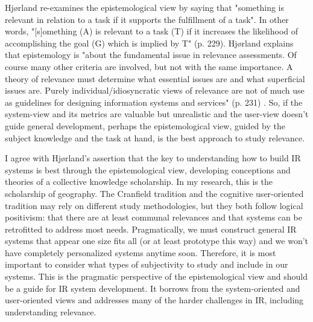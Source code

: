 
Hjørland re-examines the epistemological view by saying that "something is relevant in relation to a task if it supports the fulfillment of a task". In other words, "[s]omething (A) is relevant to a task (T) if it increases the likelihood of accomplishing the goal (G) which is implied by T" \cite{Hjorland2010}(p. 229). Hjørland explains that epistemology is "about the fundamental issue in relevance assessments. Of course many other criteria are involved, but not with the same importance. A theory of relevance must determine what essential issues are and what superficial issues are. Purely individual/idiosyncratic views of relevance are not of much use as guidelines for designing information systems and services" \cite{Hjorland2010}(p. 231) \cite{Hjorland2002}. So, if the system-view and its metrics are valuable but unrealistic and the user-view doesn't guide general development, perhaps the epistemological view, guided by the subject knowledge and the task at hand, is the best approach to study relevance.

I agree with Hjørland's assertion that the key to understanding how to build IR systems is best through the epistemological view, developing conceptions and theories of a collective knowledge scholarship. In my research, this is the scholarship of geography. The Cranfield tradition and the cognitive user-oriented tradition may rely on different study methodologies, but they both follow logical positivism: that there are at least communal relevances and that systems can be retrofitted to address most needs. Pragmatically, we must construct general IR systems that appear one size fits all (or at least prototype this way) and we won't have completely personalized systems anytime soon. Therefore, it is most important to consider what types of subjectivity to study and include in our systems. This is the pragmatic perspective of the epistemological view and should be a guide for IR system development. It borrows from the system-oriented and user-oriented views and addresses many of the harder challenges in IR, including understanding relevance.